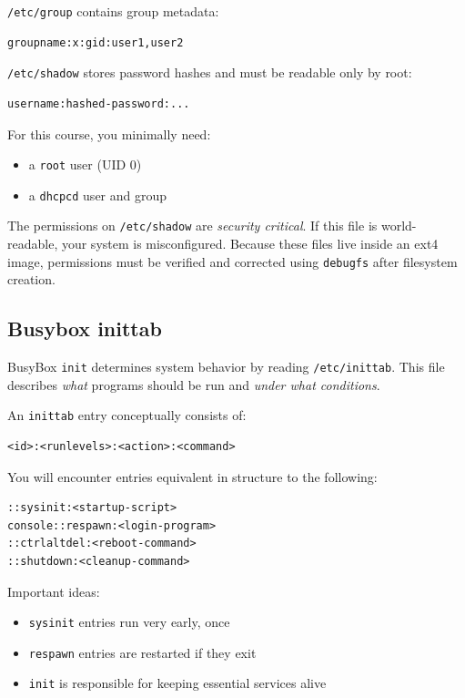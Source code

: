 \documentclass{../juni}
\begin{document}
\texttt{/etc/group} contains group metadata:
\begin{verbatim}
groupname:x:gid:user1,user2
\end{verbatim}

\texttt{/etc/shadow} stores password hashes and must be readable only by root:
\begin{verbatim}
username:hashed-password:...
\end{verbatim}

For this course, you minimally need:
\begin{itemize}
  \item a \texttt{root} user (UID 0)
  \item a \texttt{dhcpcd} user and group
\end{itemize}

The permissions on \texttt{/etc/shadow} are \emph{security critical}. If this file
is world-readable, your system is misconfigured. Because these files live inside
an ext4 image, permissions must be verified and corrected using \texttt{debugfs}
after filesystem creation.

\subsection{Busybox inittab}

BusyBox \texttt{init} determines system behavior by reading
\texttt{/etc/inittab}. This file describes \emph{what} programs should be run
and \emph{under what conditions}.

An \texttt{inittab} entry conceptually consists of:
\begin{verbatim}
<id>:<runlevels>:<action>:<command>
\end{verbatim}

You will encounter entries equivalent in structure to the following:

\begin{verbatim}
::sysinit:<startup-script>
console::respawn:<login-program>
::ctrlaltdel:<reboot-command>
::shutdown:<cleanup-command>
\end{verbatim}

Important ideas:
\begin{itemize}
  \item \texttt{sysinit} entries run very early, once
  \item \texttt{respawn} entries are restarted if they exit
  \item \texttt{init} is responsible for keeping essential services alive
\end{itemize}
\end{document}
